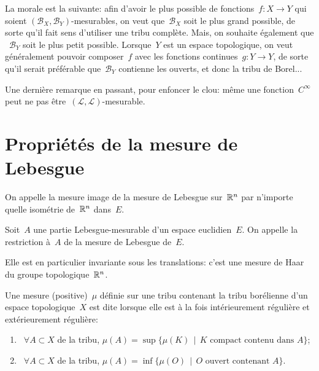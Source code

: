 \begin{remarque}
La morale est la suivante:
afin d'avoir le plus possible de fonctions~$f: X\rightarrow Y$ qui soient $(\mathcal{B}_X,\mathcal{B}_Y)$-mesurables, on veut que~$\mathcal{B}_X$ soit le plus grand possible, de sorte qu'il fait sens d'utiliser une tribu complète. Mais, on souhaite également que ~$\mathcal{B}_Y$ soit le plus petit possible. Lorsque~$Y$ est un espace topologique, on veut généralement pouvoir composer~$f$ avec les fonctions continues~$g: Y\rightarrow Y$, de sorte qu'il serait préférable que~$\mathcal{B}_Y$ contienne les ouverts, et donc la tribu de Borel...

Une dernière remarque en passant, pour enfoncer le clou: même une fonction~$C^\infty$ peut ne pas être~$(\mathcal{L},\mathcal{L})$-mesurable.
\end{remarque}

\section{Propriétés de la mesure de Lebesgue}

On appelle  la mesure image de la mesure de Lebesgue sur~$\mathbb R^n$ par n'importe quelle isométrie de~$\mathbb R^n$ dans~$E$.

Soit~$A$ une partie Lebesgue-mesurable d'un espace euclidien~$E$.
On appelle  la restriction à~$A$ de la mesure de Lebesgue de~$E$.

\begin{theoreme}
Elle est en particulier invariante sous les translations: c'est une mesure de Haar 
du groupe topologique~$\mathbb R^n$.
\end{theoreme}


\begin{definition}
Une mesure (positive)~$\mu$ définie sur une tribu contenant la tribu borélienne d'un espace topologique~$X$ est dite  lorsque elle est à la fois intérieurement régulière et extérieurement régulière:
\begin{enumerate}
\item~$\forall A\subset X$ de la tribu, $\mu(A)=\sup\{\mu(K)\,\mid\, K \text{ compact contenu dans } A\}$;
\item~$\forall A\subset X$ de la tribu, $\mu(A)=\inf\{\mu(O)\,\mid\, O \text{ ouvert contenant } A\}$.
\end{enumerate}
\end{definition}

